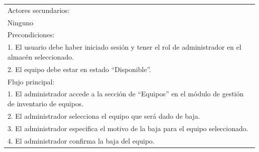 \documentclass[stu, 12pt, letterpaper, donotrepeattitle, floatsintext, natbib]{apa7}
\begin{document}
\begin{longtable}{@{} p{16.5cm} @{}}
    Actores secundarios:                                                                                                                                                                                                              \\
    Ninguno                                                                                                                                                                                                                           \\ \midrule
    Precondiciones:                                                                                                                                                                                                                   \\
    1. El usuario debe haber iniciado sesión y tener el rol de administrador en el almacén seleccionado.                                                                                                                              \\
    2. El equipo debe estar en estado ``Disponible''.                                                                                                                                                                                 \\ \midrule
    Flujo principal:                                                                                                                                                                                                                  \\
    1. El administrador accede a la sección de ``Equipos'' en el módulo de gestión de inventario de equipos.                                                                                                                          \\
    2. El administrador selecciona el equipo que será dado de baja.                                                                                                                                                                   \\
    3. El administrador especifica el motivo de la baja para el equipo seleccionado.                                                                                                                                                  \\
    4. El administrador confirma la baja del equipo.                                                                                                                                                                                  \\

\end{longtable}
\end{document}
